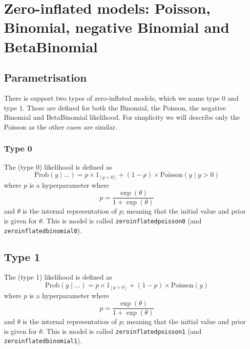 \documentclass[a4paper,11pt]{article}
\begin{document}
\section*{Zero-inflated models: Poisson, Binomial, negative Binomial
    and BetaBinomial}

\subsection*{Parametrisation}

There is support two types of zero-inflated models, which we name type
$0$ and type $1$. These are defined for both the Binomial, the
Poisson, the negative Binomial and BetaBinomial likelihood. For
simplicity we will describe only the Poisson as the other cases are
similar.

\subsubsection*{Type 0}

The (type 0) likelihood is defined as
\begin{displaymath}
    \text{Prob}(y \mid \ldots ) = p \times 1_{[y=0]} +
    (1-p)\times \text{Poisson}(y \mid y > 0)
\end{displaymath}
where $p$ is a hyperparameter where
\begin{displaymath}
    p = \frac{\exp(\theta)}{1+\exp(\theta)}
\end{displaymath}
and $\theta$ is the internal representation of $p$; meaning that the
initial value and prior is given for $\theta$. This is model is called
\texttt{zeroinflatedpoisson0} (and \texttt{zeroinflatedbinomial0}).

\subsection*{Type 1}

The (type 1) likelihood is defined as
\begin{displaymath}
    \text{Prob}(y \mid \ldots ) = p \times 1_{[y=0]} +
    (1-p)\times \text{Poisson}(y)
\end{displaymath}
where $p$ is a hyperparameter where
\begin{displaymath}
    p = \frac{\exp(\theta)}{1+\exp(\theta)}
\end{displaymath}
and $\theta$ is the internal representation of $p$; meaning that the
initial value and prior is given for $\theta$. This is model is called
\texttt{zeroinflatedpoisson1} (and \texttt{zeroinflatedbinomial1}).
\end{document}
